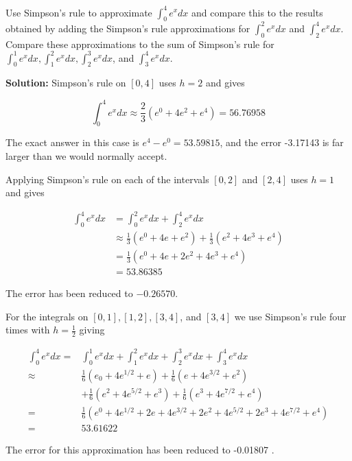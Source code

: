 \documentclass[12pt,a4paper]{article}
\begin{document}
\begin{example}
Use Simpson's rule to approximate $\int_{0}^{4} e^{x} d x$ and compare this to the results obtained by adding the Simpson's rule approximations for $\int_{0}^{2} e^{x} d x$ and $\int_{2}^{4} e^{x} d x$. Compare these approximations to the sum of Simpson's rule for $\int_{0}^{1} e^{x} d x, \int_{1}^{2} e^{x} d x, \int_{2}^{3} e^{x} d x$, and $\int_{3}^{4} e^{x} d x$.


\textbf{Solution:}
Simpson's rule on $[0,4]$ uses $h=2$ and gives

$$
\int_{0}^{4} e^{x} d x \approx \frac{2}{3}\left(e^{0}+4 e^{2}+e^{4}\right)=56.76958
$$

The exact answer in this case is $e^{4}-e^{0}=53.59815$, and the error -3.17143 is far larger than we would normally accept.

Applying Simpson's rule on each of the intervals $[0,2]$ and $[2,4]$ uses $h=1$ and gives

$$
\begin{aligned}
\int_{0}^{4} e^{x} d x & =\int_{0}^{2} e^{x} d x+\int_{2}^{4} e^{x} d x \\
& \approx \frac{1}{3}\left(e^{0}+4 e+e^{2}\right)+\frac{1}{3}\left(e^{2}+4 e^{3}+e^{4}\right) \\
& =\frac{1}{3}\left(e^{0}+4 e+2 e^{2}+4 e^{3}+e^{4}\right) \\
& =53.86385
\end{aligned}
$$

The error has been reduced to $-0.26570$.

For the integrals on $[0,1],[1,2],[3,4]$, and $[3,4]$ we use Simpson's rule four times with $h=\frac{1}{2}$ giving

$$
\begin{aligned}
\int_{0}^{4} e^{x} d x= & \int_{0}^{1} e^{x} d x+\int_{1}^{2} e^{x} d x+\int_{2}^{3} e^{x} d x+\int_{3}^{4} e^{x} d x \\
\approx & \frac{1}{6}\left(e_{0}+4 e^{1 / 2}+e\right)+\frac{1}{6}\left(e+4 e^{3 / 2}+e^{2}\right) \\
& +\frac{1}{6}\left(e^{2}+4 e^{5 / 2}+e^{3}\right)+\frac{1}{6}\left(e^{3}+4 e^{7 / 2}+e^{4}\right) \\
= & \frac{1}{6}\left(e^{0}+4 e^{1 / 2}+2 e+4 e^{3 / 2}+2 e^{2}+4 e^{5 / 2}+2 e^{3}+4 e^{7 / 2}+e^{4}\right) \\
= & 53.61622
\end{aligned}
$$

The error for this approximation has been reduced to -0.01807 .
\end{example}
\end{document}
